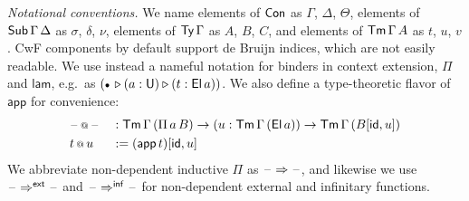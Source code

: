 \documentclass[sigplan,review,anonymous]{acmart}\settopmatter{printfolios=true,printccs=false,printacmref=false}
\makeatletter
\newcommand{\ext}{\triangleright}
\newcommand{\emptycon}{\scaleobj{.75}\bullet}
\newcommand{\Pii}{\Pi}
\newcommand{\appi}{\mathsf{app}}
\newcommand{\lami}{\mathsf{lam}}
\newcommand{\Pie}{\Pi^{\mathsf{ext}}}
\newcommand{\Piinf}{\Pi^{\mathsf{inf}}}
\newcommand{\appitt}{\mathop{{\scriptstyle @}}}
\newcommand{\p}{\mathsf{p}}
\newcommand{\arri}{\Rightarrow}
\newcommand{\arre}{\Rightarrow^{\mathsf{ext}}}
\newcommand{\arrinf}{\Rightarrow^{\mathsf{inf}}}
\makeatother
\begin{document}
\emph{Notational conventions.} We name elements of $\mathsf{Con}$ as $\Gamma$, $\Delta$,
$\Theta$, elements of $\mathsf{Sub}\,\Gamma\,\Delta$ as $\sigma$, $\delta$, $\nu$,
elements of $\mathsf{Ty}\,\Gamma$ as $A$, $B$, $C$, and elements of $\mathsf{Tm}\,\Gamma\,A$ as
$t$, $u$, $v$. CwF components by default support de Bruijn indices, which are
not easily readable. We use instead a nameful notation for binders in context
extension, $\Pii$ and $\lami$, e.g.\ as $(\emptycon\,\ext (a : \U) \ext (t :
\El\,a))$. We also define a type-theoretic flavor of $\appi$ for convenience:
\begin{alignat*}{3}
  & \blank\appitt\blank && :
      \Tm\,\Gamma\,(\Pii\,a\,B)\ra
      (u : \Tm\,\Gamma\,(\El\,a)) \ra \Tm\,\Gamma\,(B[\id, u])\\
  & t\appitt u && := (\appi\,t)[\id, u]
\end{alignat*}
We abbreviate non-dependent inductive $\Pii$ as $\blank\arri\blank$, and
likewise we use $\blank\arre\blank$ and $\blank\arrinf\blank$ for non-dependent
external and infinitary functions.

\end{document}

